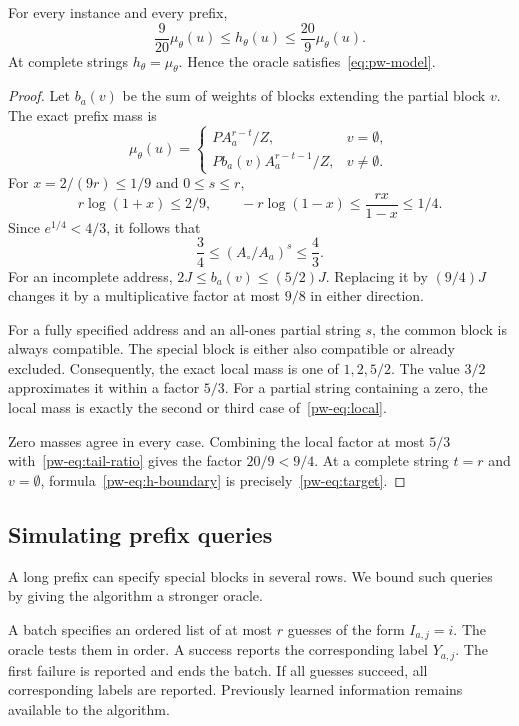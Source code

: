 \begin{lemma}\label{pw-lem:oracle}
For every instance and every prefix,
\[
\frac9{20}\mu_\theta(u)\le h_\theta(u)\le\frac{20}9\mu_\theta(u).
\]
At complete strings $h_\theta=\mu_\theta$. Hence the oracle satisfies~\eqref{eq:pw-model}.
\end{lemma}
\begin{proof}
Let $b_a(v)$ be the sum of weights of blocks extending the partial block $v$. The exact prefix mass is
\begin{equation}\label{pw-eq:prefix-exact}
\mu_\theta(u)=
\begin{cases}
P A_a^{r-t}/Z,&v=\emptyset,\\
P b_a(v)A_a^{r-t-1}/Z,&v\ne\emptyset.
\end{cases}
\end{equation}
For $x=2/(9r)\le1/9$ and $0\le s\le r$,
\[
r\log(1+x)\le 2/9,
\qquad -r\log(1-x)\le\frac{rx}{1-x}\le1/4.
\]
Since $e^{1/4}<4/3$, it follows that
\begin{equation}\label{pw-eq:tail-ratio}
\frac34\le (A_\circ/A_a)^s\le\frac43.
\end{equation}
For an incomplete address, $2J\le b_a(v)\le(5/2)J$. Replacing it by $(9/4)J$ changes it by a multiplicative factor at most $9/8$ in either direction.

For a fully specified address and an all-ones partial string $s$, the common block is always compatible. The special block is either also compatible or already excluded. Consequently, the exact local mass is one of $1,2,5/2$. The value $3/2$ approximates it within a factor $5/3$. For a partial string containing a zero, the local mass is exactly the second or third case of~\eqref{pw-eq:local}.

Zero masses agree in every case. Combining the local factor at most $5/3$ with~\eqref{pw-eq:tail-ratio} gives the factor $20/9<9/4$. At a complete string $t=r$ and $v=\emptyset$, formula~\eqref{pw-eq:h-boundary} is precisely~\eqref{pw-eq:target}.
\end{proof}

\subsection{Simulating prefix queries}\label{pw-sec:search}

A long prefix can specify special blocks in several rows. We bound such queries by giving the algorithm a stronger oracle.

\begin{definition}\label{pw-def:batch}
A batch specifies an ordered list of at most $r$ guesses of the form $I_{a,j}=i$. The oracle tests them in order. A success reports the corresponding label $Y_{a,j}$. The first failure is reported and ends the batch. If all guesses succeed, all corresponding labels are reported. Previously learned information remains available to the algorithm.
\end{definition}

